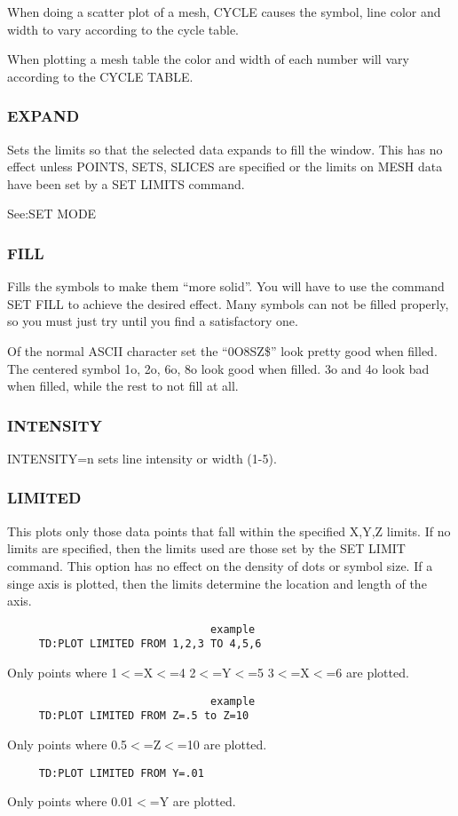 When  doing  a  scatter  plot  of a mesh, CYCLE causes the symbol, line
color and width to vary according to the cycle table.  

When plotting a mesh table the color and width of each number will vary
according to the CYCLE TABLE.  
\subsubsection{EXPAND}
Sets  the  limits so that the selected data expands to fill the window.
This has no effect unless POINTS, SETS, SLICES  are  specified  or  the
limits on MESH data have been set by a SET LIMITS command.  

See:SET MODE 
\subsubsection{FILL}
Fills  the symbols to make them ``more solid''.  You will have to use the
command SET FILL to achieve the desired effect.  Many symbols  can  not
be  filled properly, so you must just try until you find a satisfactory
one.  

Of  the  normal  ASCII character set the ``0O8SZ\$'' look pretty good when
filled.  The centered symbol 1o, 2o, 6o, 8o look good when filled.   3o
and 4o look bad when filled, while the rest to not fill at all.  
\subsubsection{INTENSITY}
INTENSITY=n sets line intensity or width (1-5).  
\subsubsection{LIMITED}
This  plots only those data points that fall within the specified X,Y,Z
limits.  If no limits are specified, then the limits used are those set
by  the SET LIMIT command.  This option has no effect on the density of
dots or symbol size.  If a singe  axis  is  plotted,  then  the  limits
determine the location and length of the axis.  

\begin{verbatim}
                                example
     TD:PLOT LIMITED FROM 1,2,3 TO 4,5,6 
\end{verbatim}
Only points where 1$<$=X$<$=4 2$<$=Y$<$=5 3$<$=X$<$=6 are plotted.  

\begin{verbatim}
                                example
     TD:PLOT LIMITED FROM Z=.5 to Z=10 
\end{verbatim}
Only points where 0.5$<$=Z$<$=10 are plotted.  
\begin{verbatim}
     TD:PLOT LIMITED FROM Y=.01 
\end{verbatim}
Only points where 0.01$<$=Y are plotted.  

